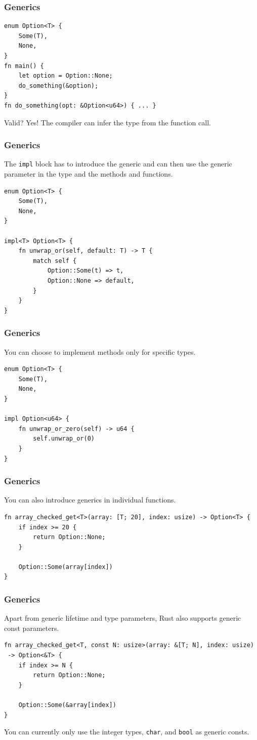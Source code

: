 \begin{frame}[fragile]
    \frametitle{Generics}
    \begin{verbatim}
enum Option<T> {
    Some(T),
    None,
}
fn main() {
    let option = Option::None;
    do_something(&option);
}
fn do_something(opt: &Option<u64>) { ... }
    \end{verbatim}
    \vfill
    Valid?
    \pause
    \vfill
    Yes! The compiler can infer the type from the function call.
\end{frame}

\begin{frame}[fragile]
    \frametitle{Generics}
    The \texttt{impl} block has to introduce the generic and can then use the generic parameter in the type and the methods and functions.
    \pause
    \vfill
    \begin{verbatim}
enum Option<T> {
    Some(T),
    None,
}

impl<T> Option<T> {
    fn unwrap_or(self, default: T) -> T {
        match self {
            Option::Some(t) => t,
            Option::None => default,
        }
    }
}
    \end{verbatim}
\end{frame}

\begin{frame}[fragile]
    \frametitle{Generics}
    You can choose to implement methods only for specific types.
    \pause
    \vfill
    \begin{verbatim}
enum Option<T> {
    Some(T),
    None,
}

impl Option<u64> {
    fn unwrap_or_zero(self) -> u64 {
        self.unwrap_or(0)
    }
}
    \end{verbatim}
\end{frame}

\begin{frame}[fragile]
    \frametitle{Generics}
    You can also introduce generics in individual functions.
    \pause
    \vfill
    \begin{verbatim}
fn array_checked_get<T>(array: [T; 20], index: usize) -> Option<T> {
    if index >= 20 {
        return Option::None;
    }

    Option::Some(array[index])
}
    \end{verbatim}
\end{frame}

\begin{frame}[fragile]
    \frametitle{Generics}
    Apart from generic lifetime and type parameters, Rust also supports generic const parameters.
    \pause
    \vfill
    \begin{verbatim}
fn array_checked_get<T, const N: usize>(array: &[T; N], index: usize)
 -> Option<&T> {
    if index >= N {
        return Option::None;
    }

    Option::Some(&array[index])
}
    \end{verbatim}
    \pause
    \vfill
    You can currently only use the integer types, \texttt{char}, and \texttt{bool} as generic consts.
\end{frame}

